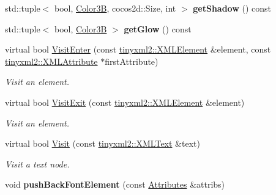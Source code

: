 \begin{DoxyCompactItemize}
\mbox{\label{classMyXMLVisitor_ae0f66872bf15928a1eb039b32b824dd1}} 
std\+::tuple$<$ bool, \hyperlink{structColor3B}{Color3B}, cocos2d\+::\+Size, int $>$ {\bfseries get\+Shadow} () const
\item 
\mbox{\label{classMyXMLVisitor_a96360f8968e859b34347c01af6aae9e8}} 
std\+::tuple$<$ bool, \hyperlink{structColor3B}{Color3B} $>$ {\bfseries get\+Glow} () const
\item 
\mbox{\label{classMyXMLVisitor_a92bce41265c7e499c9aa6ec57f82128a}} 
virtual bool \hyperlink{classMyXMLVisitor_a92bce41265c7e499c9aa6ec57f82128a}{Visit\+Enter} (const \hyperlink{classtinyxml2_1_1XMLElement}{tinyxml2\+::\+X\+M\+L\+Element} \&element, const \hyperlink{classtinyxml2_1_1XMLAttribute}{tinyxml2\+::\+X\+M\+L\+Attribute} $\ast$first\+Attribute)
\begin{DoxyCompactList}\small\item\em Visit an element. \end{DoxyCompactList}\item 
\mbox{\label{classMyXMLVisitor_ab9f66d59ebac21016fded2054d3fbe8b}} 
virtual bool \hyperlink{classMyXMLVisitor_ab9f66d59ebac21016fded2054d3fbe8b}{Visit\+Exit} (const \hyperlink{classtinyxml2_1_1XMLElement}{tinyxml2\+::\+X\+M\+L\+Element} \&element)
\begin{DoxyCompactList}\small\item\em Visit an element. \end{DoxyCompactList}\item 
\mbox{\label{classMyXMLVisitor_ac7a2a4b0ec103641b379db7123f29a61}} 
virtual bool \hyperlink{classMyXMLVisitor_ac7a2a4b0ec103641b379db7123f29a61}{Visit} (const \hyperlink{classtinyxml2_1_1XMLText}{tinyxml2\+::\+X\+M\+L\+Text} \&text)
\begin{DoxyCompactList}\small\item\em Visit a text node. \end{DoxyCompactList}\item 
\mbox{\label{classMyXMLVisitor_ab94c7279ab48928d8356c9c77be5491e}} 
void {\bfseries push\+Back\+Font\+Element} (const \hyperlink{structMyXMLVisitor_1_1Attributes}{Attributes} \&attribs)
\item 

\end{DoxyCompactItemize}
